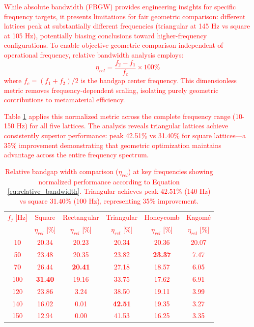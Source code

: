 \documentclass[review,numbers,sort&compress]{elsarticle}
\begin{document}
\textcolor{red}{While absolute bandwidth (FBGW) provides engineering insights for specific frequency targets, it presents limitations for fair geometric comparison: different lattices peak at substantially different frequencies (triangular at 145 Hz vs square at 105 Hz), potentially biasing conclusions toward higher-frequency configurations. To enable objective geometric comparison independent of operational frequency, relative bandwidth analysis employs:
\begin{equation}
\eta_{rel} = \frac{f_2 - f_1}{f_c} \times 100\%
\label{eq:relative_bandwidth}
\end{equation}
where $f_c = (f_1 + f_2)/2$ is the bandgap center frequency. This dimensionless metric removes frequency-dependent scaling, isolating purely geometric contributions to metamaterial efficiency.}

\textcolor{red}{Table \ref{tab:relative_bandwidth_comparison} applies this normalized metric across the complete frequency range (10-150 Hz) for all five lattices. The analysis reveals triangular lattices achieve consistently superior performance: peak 42.51\% vs 31.40\% for square lattices---a 35\% improvement demonstrating that geometric optimization maintains advantage across the entire frequency spectrum.}

\begin{table}[htb]
\centering
\caption{\textcolor{red}{Relative bandgap width comparison ($\eta_{rel}$) at key frequencies showing normalized performance according to Equation \ref{eq:relative_bandwidth}. Triangular achieves peak 42.51\% (140 Hz) vs square 31.40\% (100 Hz), representing 35\% improvement.}}
\label{tab:relative_bandwidth_comparison}
\textcolor{red}{
\footnotesize
\begin{tabular}{cccccc}
\hline
$f_j$ [Hz] & Square & Rectangular & Triangular & Honeycomb & Kagomé \\
& $\eta_{rel}$ [\%] & $\eta_{rel}$ [\%] & $\eta_{rel}$ [\%] & $\eta_{rel}$ [\%] & $\eta_{rel}$ [\%] \\
\hline
10 & 20.34 & 20.23 & 20.34 & 20.36 & 20.07 \\
50 & 23.48 & 20.35 & 23.82 & \textbf{23.37} & 7.47 \\
70 & 26.44 & \textbf{20.41} & 27.18 & 18.57 & 6.05 \\
100 & \textbf{31.40} & 19.16 & 33.75 & 17.62 & 6.91 \\
120 & 23.86 & 3.24 & 38.50 & 19.11 & 3.99 \\
140 & 16.02 & 0.01 & \textbf{42.51} & 19.35 & 3.27 \\
150 & 12.94 & 0.00 & 41.53 & 16.25 & 3.35 \\
\hline
\end{tabular}
}
\end{table}
\end{document}
